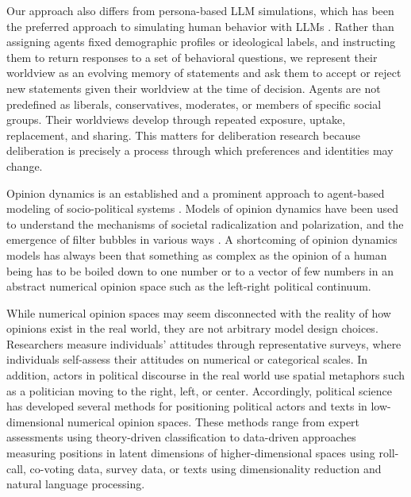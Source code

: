 \documentclass[]{ceurart}
\begin{document}
Our approach also differs from persona-based LLM simulations, which has
been the preferred approach to simulating human behavior with LLMs
\citep{ArgyleEtAl2023OutOneMany, PromaEtAl2026CanLLMsEmulate}. Rather
than assigning agents fixed demographic profiles or ideological labels,
and instructing them to return responses to a set of behavioral
questions, we represent their worldview as an evolving memory of
statements and ask them to accept or reject new statements given their
worldview at the time of decision. Agents are not predefined as
liberals, conservatives, moderates, or members of specific social
groups. Their worldviews develop through repeated exposure, uptake,
replacement, and sharing. This matters for deliberation research because
deliberation is precisely a process through which preferences and
identities may change.

Opinion dynamics is an established and a prominent approach to
agent-based modeling of socio-political systems
\citep{FlacheEtAl2017ModelsSocialInfluence, LorenzEtAl2021IndividualAttitudeChange}.
Models of opinion dynamics have been used to understand the mechanisms
of societal radicalization and polarization, and the emergence of filter
bubbles in various ways
\citep{KeijzerMaes2022ComplexLinkFilter, KeijzerEtAl2026ComputationalSocialScience}.
A shortcoming of opinion dynamics models has always been that something
as complex as the opinion of a human being has to be boiled down to one
number or to a vector of few numbers in an abstract numerical opinion
space such as the left-right political continuum.

While numerical opinion spaces may seem disconnected with the reality of
how opinions exist in the real world, they are not arbitrary model
design choices. Researchers measure individuals' attitudes through
representative surveys, where individuals self-assess their attitudes on
numerical or categorical scales. In addition, actors in political
discourse in the real world use spatial metaphors such as a politician
moving to the right, left, or center. Accordingly, political science has
developed several methods for positioning political actors and texts in
low-dimensional numerical opinion spaces. These methods range from
expert assessments using theory-driven classification to data-driven
approaches measuring positions in latent dimensions of
higher-dimensional spaces using roll-call, co-voting data, survey data,
or texts using dimensionality reduction and natural language processing.
\end{document}
